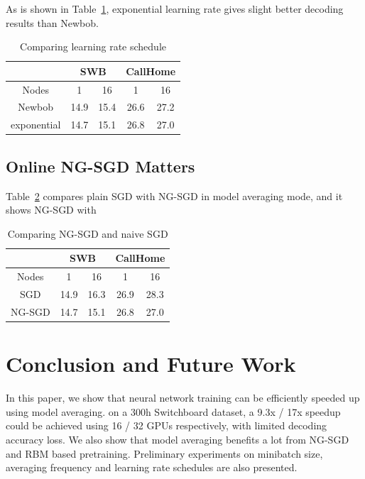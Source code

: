\documentclass{article}
\begin{document}
As is shown in Table~\ref{tab:lr}, exponential learning rate gives slight better decoding results than Newbob.
\begin{table}
  \centering
  \begin{tabular}{c|c|c|c|c}
    \hline
    & \multicolumn{2}{c|}{SWB}  & \multicolumn{2}{c}{CallHome} \\
    \hline
    Nodes       &  1      & 16    &  1    & 16 \\
    \hline
    Newbob      & 14.9    & 15.4  & 26.6  & 27.2 \\
    \hline
    exponential & 14.7    & 15.1  & 26.8  & 27.0 \\
    \hline
  \end{tabular}
  \caption{Comparing learning rate schedule}
  \label{tab:lr}
\end{table}

\subsection{Online NG-SGD Matters}
Table~\ref{tab:ngsgd} compares plain SGD with NG-SGD in model averaging mode, and it shows NG-SGD with 
\begin{table}
  \centering
  \begin{tabular}{c|c|c|c|c}
    \hline
    & \multicolumn{2}{c|}{SWB}  & \multicolumn{2}{c}{CallHome} \\
    \hline
     Nodes  &  1    & 16        &   1   &  16 \\
    \hline
    SGD     & 14.9    & 16.3    &  26.9 & 28.3 \\
    \hline
    NG-SGD  & 14.7    & 15.1    &  26.8 & 27.0  \\
    \hline
  \end{tabular}
  \caption{Comparing NG-SGD and naive SGD}
  \label{tab:ngsgd}
\end{table}

\section{Conclusion and Future Work}
In this paper, we show that neural network training can be efficiently speeded up using model averaging. 
on a 300h Switchboard dataset, a 9.3x / 17x speedup could be achieved using 16 / 32 GPUs respectively, 
with limited decoding accuracy loss. We also show that model averaging benefits a lot from NG-SGD and RBM based pretraining.
Preliminary experiments on minibatch size, averaging frequency and learning rate schedules are also presented.
\end{document}
